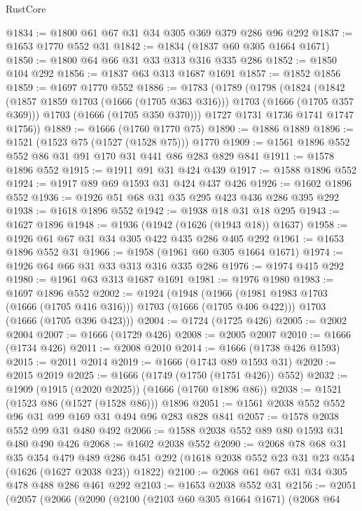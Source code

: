 \begin{lexlean}{RustCore}
\begin{coremodule}
@1834 := @1800 @61 @67 @31 @34 @305 @369 @379 @286 @96 @292
@1837 := @1653 @1770 @552 @31
@1842 := @1834 (@1837 @60 @305 @1664 @1671)
@1850 := @1800 @64 @66 @31 @33 @313 @316 @335 @286
@1852 := @1850 @104 @292
@1856 := @1837 @63 @313 @1687 @1691
@1857 := @1852 @1856
@1859 := @1697 @1770 @552
@1886 := @1783
    (@1789
      (@1798
        (@1824
          (@1842 (@1857 @1859 @1703 (@1666 (@1705 @363 @316))) @1703 (@1666 (@1705 @357 @369)))
          @1703
          (@1666 (@1705 @350 @370)))
        @1727
        @1731
        @1736
        @1741
        @1747
        @1756))
@1889 := @1666 (@1760 @1770 @75)
@1890 := @1886 @1889
@1896 := @1521 (@1523 @75 (@1527 (@1528 @75))) @1770
@1909 := @1561 @1896 @552 @552 @86 @31 @91 @170 @31 @441 @86 @283 @829 @841
@1911 := @1578 @1896 @552
@1915 := @1911 @91 @31 @424 @439
@1917 := @1588 @1896 @552
@1924 := @1917 @89 @69 @1593 @31 @424 @437 @426
@1926 := @1602 @1896 @552
@1936 := @1926 @51 @68 @31 @35 @295 @423 @436 @286 @395 @292
@1938 := @1618 @1896 @552
@1942 := @1938 @18 @31 @18 @295
@1943 := @1627 @1896
@1948 := @1936 (@1942 (@1626 (@1943 @18)) @1637)
@1958 := @1926 @61 @67 @31 @34 @305 @422 @435 @286 @405 @292
@1961 := @1653 @1896 @552 @31
@1966 := @1958 (@1961 @60 @305 @1664 @1671)
@1974 := @1926 @64 @66 @31 @33 @313 @316 @335 @286
@1976 := @1974 @415 @292
@1980 := @1961 @63 @313 @1687 @1691
@1981 := @1976 @1980
@1983 := @1697 @1896 @552
@2002 := @1924
    (@1948
      (@1966 (@1981 @1983 @1703 (@1666 (@1705 @416 @316))) @1703 (@1666 (@1705 @406 @422)))
      @1703
      (@1666 (@1705 @396 @423)))
@2004 := @1724 (@1725 @426)
@2005 := @2002 @2004
@2007 := @1666 (@1729 @426)
@2008 := @2005 @2007
@2010 := @1666 (@1734 @426)
@2011 := @2008 @2010
@2014 := @1666 (@1738 @426 @1593)
@2015 := @2011 @2014
@2019 := @1666 (@1743 @89 @1593 @31)
@2020 := @2015 @2019
@2025 := @1666 (@1749 (@1750 (@1751 @426)) @552)
@2032 := @1909 (@1915 (@2020 @2025)) (@1666 (@1760 @1896 @86))
@2038 := @1521 (@1523 @86 (@1527 (@1528 @86))) @1896
@2051 := @1561 @2038 @552 @552 @96 @31 @99 @169 @31 @494 @96 @283 @828 @841
@2057 := @1578 @2038 @552 @99 @31 @480 @492
@2066 := @1588 @2038 @552 @89 @80 @1593 @31 @480 @490 @426
@2068 := @1602 @2038 @552
@2090 := @2068
    @78
    @68
    @31
    @35
    @354
    @479
    @489
    @286
    @451
    @292
    (@1618 @2038 @552 @23 @31 @23 @354 (@1626 (@1627 @2038 @23)) @1822)
@2100 := @2068 @61 @67 @31 @34 @305 @478 @488 @286 @461 @292
@2103 := @1653 @2038 @552 @31
@2156 := @2051
    (@2057
      (@2066
        (@2090
          (@2100
            (@2103 @60 @305 @1664 @1671)
            (@2068
              @64

\end{coremodule}
\end{lexlean}
